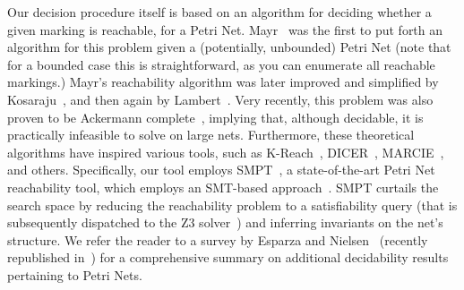 Our decision procedure itself is based on an algorithm for deciding whether a given marking is reachable, for a Petri Net.
%
Mayr~\cite{Ma81} was the first to put forth an algorithm for this problem given a (potentially, unbounded) Petri Net (note that for a bounded case this is straightforward, as you can enumerate all reachable markings.)
%
Mayr's reachability algorithm was later improved and simplified by Kosaraju~\cite{Ko82}, and then again by Lambert~\cite{La92}.
%
Very recently, this problem was also proven to be Ackermann complete~\cite{CzWo22}, implying that, although decidable, it is practically infeasible to solve on large nets.
%
Furthermore, these theoretical algorithms have inspired various tools, such as K-Reach~\cite{DiLa20}, DICER~\cite{XiZhLi21}, MARCIE~\cite{HeRoSc13}, and others. 
%
Specifically, our tool employs SMPT~\cite{AmDa23}, a state-of-the-art Petri Net reachability tool, which employs an SMT-based approach~\cite{AmBeDa21, AmDaHu22}. SMPT curtails the search space by reducing the reachability problem to a satisfiability query (that is subsequently dispatched to the Z3 solver~\cite{DeBj08}) and inferring invariants on the net's structure.
%
We refer the reader to a survey by Esparza and Nielsen~\cite{EsNi94} (recently republished in~\cite{EsNi24}) for a comprehensive summary on additional decidability results pertaining to Petri Nets.
 
 








